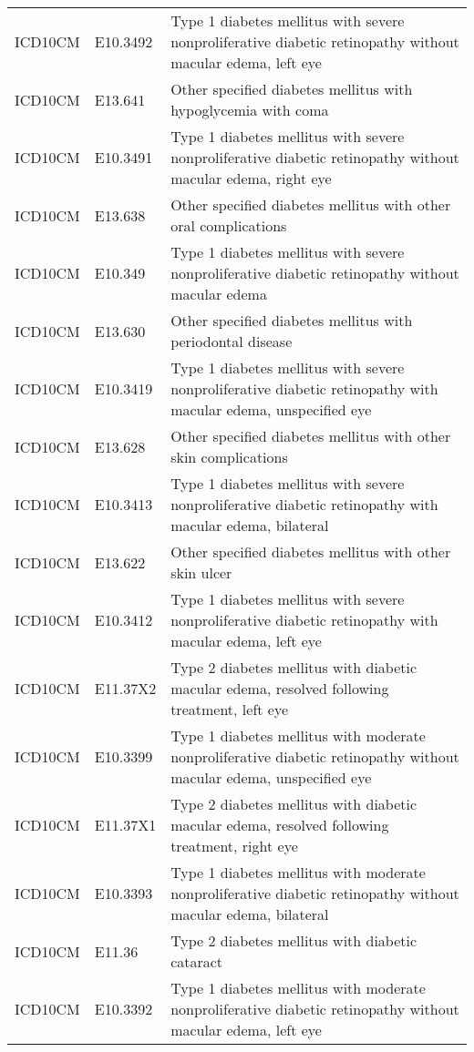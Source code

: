 \begin{table}[ht]
\begin{tabular}{lll}
  ICD10CM & E10.3492 & Type 1 diabetes mellitus with severe nonproliferative diabetic retinopathy without macular edema, left eye \\ 
  ICD10CM & E13.641 & Other specified diabetes mellitus with hypoglycemia with coma \\ 
  ICD10CM & E10.3491 & Type 1 diabetes mellitus with severe nonproliferative diabetic retinopathy without macular edema, right eye \\ 
  ICD10CM & E13.638 & Other specified diabetes mellitus with other oral complications \\ 
  ICD10CM & E10.349 & Type 1 diabetes mellitus with severe nonproliferative diabetic retinopathy without macular edema \\ 
  ICD10CM & E13.630 & Other specified diabetes mellitus with periodontal disease \\ 
  ICD10CM & E10.3419 & Type 1 diabetes mellitus with severe nonproliferative diabetic retinopathy with macular edema, unspecified eye \\ 
  ICD10CM & E13.628 & Other specified diabetes mellitus with other skin complications \\ 
  ICD10CM & E10.3413 & Type 1 diabetes mellitus with severe nonproliferative diabetic retinopathy with macular edema, bilateral \\ 
  ICD10CM & E13.622 & Other specified diabetes mellitus with other skin ulcer \\ 
  ICD10CM & E10.3412 & Type 1 diabetes mellitus with severe nonproliferative diabetic retinopathy with macular edema, left eye \\ 
  ICD10CM & E11.37X2 & Type 2 diabetes mellitus with diabetic macular edema, resolved following treatment, left eye \\ 
  ICD10CM & E10.3399 & Type 1 diabetes mellitus with moderate nonproliferative diabetic retinopathy without macular edema, unspecified eye \\ 
  ICD10CM & E11.37X1 & Type 2 diabetes mellitus with diabetic macular edema, resolved following treatment, right eye \\ 
  ICD10CM & E10.3393 & Type 1 diabetes mellitus with moderate nonproliferative diabetic retinopathy without macular edema, bilateral \\ 
  ICD10CM & E11.36 & Type 2 diabetes mellitus with diabetic cataract \\ 
  ICD10CM & E10.3392 & Type 1 diabetes mellitus with moderate nonproliferative diabetic retinopathy without macular edema, left eye \\ 

\end{tabular}
\end{table}
